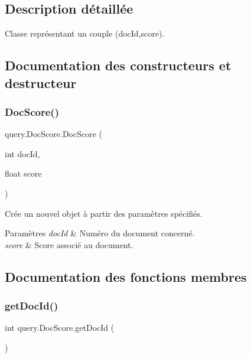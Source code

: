 \subsection{Description détaillée}
Classe représentant un couple (doc\+Id,score). 

\subsection{Documentation des constructeurs et destructeur}
\mbox{\label{classquery_1_1DocScore_aab792c66a796267c8c8aab62e897e49b}} 
\subsubsection{\texorpdfstring{Doc\+Score()}{DocScore()}}
{\footnotesize\ttfamily query.\+Doc\+Score.\+Doc\+Score (\begin{DoxyParamCaption}\item[{int}]{doc\+Id,  }\item[{float}]{score }\end{DoxyParamCaption})}

Crée un nouvel objet à partir des paramètres spécifiés.


\begin{DoxyParams}{Paramètres}
{\em doc\+Id} & Numéro du document concerné. \\
\hline
{\em score} & Score associé au document. \\
\hline
\end{DoxyParams}


\subsection{Documentation des fonctions membres}
\mbox{\label{classquery_1_1DocScore_afeca8ed1596e722c014c8ce05dc06de0}} 
\subsubsection{\texorpdfstring{get\+Doc\+Id()}{getDocId()}}
{\footnotesize\ttfamily int query.\+Doc\+Score.\+get\+Doc\+Id (\begin{DoxyParamCaption}{ }\end{DoxyParamCaption})}

